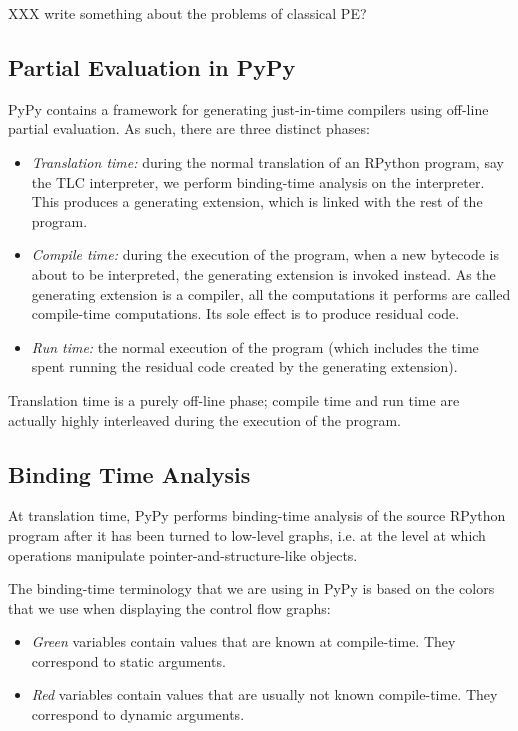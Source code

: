 XXX write something about the problems of classical PE?

\subsection{Partial Evaluation in PyPy}


PyPy contains a framework for generating just-in-time compilers using
off-line partial evaluation.  As such, there are three distinct phases:

\begin{itemize}
\item \emph{Translation time:} during the normal translation of an RPython
program, say the TLC interpreter, we perform binding-time analysis on the
interpreter.  This produces a generating extension, which is linked with the
rest of the program. 

\item \emph{Compile time:} during the execution of the program, when a new
bytecode is about to be interpreted, the generating extension is invoked
instead.  As the generating extension is a compiler, all the computations it
performs are called compile-time computations.  Its sole effect is to produce
residual code.

\item \emph{Run time:} the normal execution of the program (which includes the
time spent running the residual code created by the generating extension).
\end{itemize}

Translation time is a purely off-line phase; compile time and run time are
actually highly interleaved during the execution of the program.

\subsection{Binding Time Analysis}

At translation time, PyPy performs binding-time analysis of the source
RPython program after it has been turned to low-level graphs, i.e. at
the level at which operations manipulate pointer-and-structure-like
objects.

The binding-time terminology that we are using in PyPy is based on the
colors that we use when displaying the control flow graphs:

\begin{itemize}
\item \emph{Green} variables contain values that are known at compile-time.
They correspond to static arguments.
\item \emph{Red} variables contain values that are usually not known
compile-time. They correspond to dynamic arguments.
\end{itemize}

